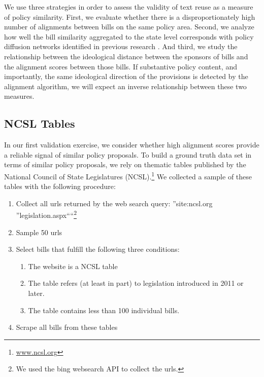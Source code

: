 \documentclass[12pt]{article} %
\begin{document}
We use three strategies in order to assess the validity of text reuse as a measure of policy similarity. First, we evaluate whether there is a disproportionately high number of alignments between bills on the same policy area. Second, we analyze how well the bill similarity aggregated to the state level corresponds with policy diffusion networks identified in previous research \citep{desmarais2015}. And third, we study the relationship between the ideological distance between the sponsors of bills and the alignment scores between those bills. If substantive policy content, and importantly, the same ideological direction of the provisions is detected by the alignment algorithm, we will expect an inverse relationship between these two measures.

\subsection{NCSL Tables}

In our first validation exercise, we consider whether high alignment scores provide a reliable signal of similar policy proposals. To build a ground truth data set in terms of similar policy proposals, we rely on thematic tables published by the National Council of State Legislatures (NCSL).\footnote{\url{www.ncsl.org}}  We collected a sample of these tables with the following procedure:

\begin{singlespacing}

\begin{enumerate}
    \item Collect all urls returned by the web search query: ''site:ncsl.org ''legislation.aspx````\footnote{We used the bing websearch API to collect the urls.}
    \item Sample 50 urls
    \item Select bills that fulfill the following three conditions:
        \begin{enumerate}
            \item The website is a NCSL table
            \item The table refers (at least in part) to legislation introduced in 2011 or later.          
             \item The table contains less than 100 individual bills. 
        \end{enumerate}
    \item Scrape all bills from these tables
\end{enumerate}

\end{singlespacing}
\end{document}
